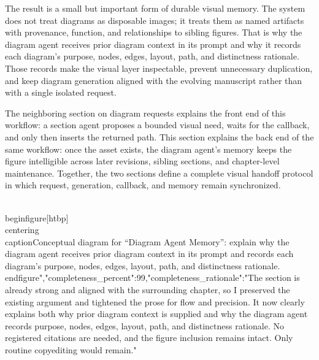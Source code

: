 {The result is a small but important form of durable visual memory. The system does not treat diagrams as disposable images; it treats them as named artifacts with provenance, function, and relationships to sibling figures. That is why the diagram agent receives prior diagram context in its prompt and why it records each diagram's purpose, nodes, edges, layout, path, and distinctness rationale. Those records make the visual layer inspectable, prevent unnecessary duplication, and keep diagram generation aligned with the evolving manuscript rather than with a single isolated request.

The neighboring section on diagram requests explains the front end of this workflow: a section agent proposes a bounded visual need, waits for the callback, and only then inserts the returned path. This section explains the back end of the same workflow: once the asset exists, the diagram agent's memory keeps the figure intelligible across later revisions, sibling sections, and chapter-level maintenance. Together, the two sections define a complete visual handoff protocol in which request, generation, callback, and memory remain synchronized.

\\begin{figure}[htbp]
\\centering
\
\\caption{Conceptual diagram for ``Diagram Agent Memory'': explain why the diagram agent receives prior diagram context in its prompt and records each diagram's purpose, nodes, edges, layout, path, and distinctness rationale.}
\\end{figure}","completeness_percent":99,"completeness_rationale":"The section is already strong and aligned with the surrounding chapter, so I preserved the existing argument and tightened the prose for flow and precision. It now clearly explains both why prior diagram context is supplied and why the diagram agent records purpose, nodes, edges, layout, path, and distinctness rationale. No registered citations are needed, and the figure inclusion remains intact. Only routine copyediting would remain."}
